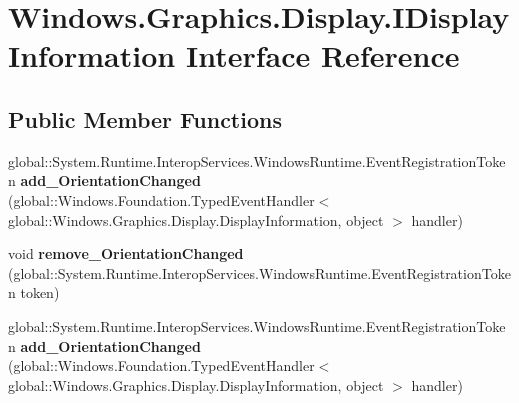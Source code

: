 \hypertarget{interface_windows_1_1_graphics_1_1_display_1_1_i_display_information}{}\section{Windows.\+Graphics.\+Display.\+I\+Display\+Information Interface Reference}
\label{interface_windows_1_1_graphics_1_1_display_1_1_i_display_information}
\subsection*{Public Member Functions}
\begin{DoxyCompactItemize}
\item 
\mbox{\label{interface_windows_1_1_graphics_1_1_display_1_1_i_display_information_a5ff17c5222c1cde6f25e263c9d966e62}} 
global\+::\+System.\+Runtime.\+Interop\+Services.\+Windows\+Runtime.\+Event\+Registration\+Token {\bfseries add\+\_\+\+Orientation\+Changed} (global\+::\+Windows.\+Foundation.\+Typed\+Event\+Handler$<$ global\+::\+Windows.\+Graphics.\+Display.\+Display\+Information, object $>$ handler)
\item 
\mbox{\label{interface_windows_1_1_graphics_1_1_display_1_1_i_display_information_a3095992abe09f6bef7068bd3a5d76684}} 
void {\bfseries remove\+\_\+\+Orientation\+Changed} (global\+::\+System.\+Runtime.\+Interop\+Services.\+Windows\+Runtime.\+Event\+Registration\+Token token)
\item 
\mbox{\label{interface_windows_1_1_graphics_1_1_display_1_1_i_display_information_a5ff17c5222c1cde6f25e263c9d966e62}} 
global\+::\+System.\+Runtime.\+Interop\+Services.\+Windows\+Runtime.\+Event\+Registration\+Token {\bfseries add\+\_\+\+Orientation\+Changed} (global\+::\+Windows.\+Foundation.\+Typed\+Event\+Handler$<$ global\+::\+Windows.\+Graphics.\+Display.\+Display\+Information, object $>$ handler)
\item 
\mbox{\label{interface_windows_1_1_graphics_1_1_display_1_1_i_display_information_a3095992abe09f6bef7068bd3a5d76684}} 

\end{DoxyCompactItemize}

